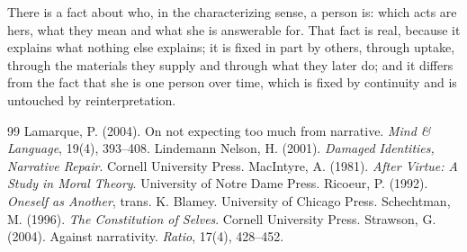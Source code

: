 \documentclass{situationist-preprint}
\begin{document}
There is a fact about who, in the characterizing sense, a person is: which acts are hers, what they mean and what she is answerable for. That fact is real, because it explains what nothing else explains; it is fixed in part by others, through uptake, through the materials they supply and through what they later do; and it differs from the fact that she is one person over time, which is fixed by continuity and is untouched by reinterpretation.

\begin{thebibliography}{99}\small
{} Lamarque, P. (2004). On not expecting too much from narrative. \emph{Mind \& Language}, 19(4), 393--408.
 Lindemann Nelson, H. (2001). \emph{Damaged Identities, Narrative Repair}. Cornell University Press.
 MacIntyre, A. (1981). \emph{After Virtue: A Study in Moral Theory}. University of Notre Dame Press.
 Ricoeur, P. (1992). \emph{Oneself as Another}, trans. K. Blamey. University of Chicago Press.
 Schechtman, M. (1996). \emph{The Constitution of Selves}. Cornell University Press.
 Strawson, G. (2004). Against narrativity. \emph{Ratio}, 17(4), 428--452.
\end{thebibliography}
\end{document}
